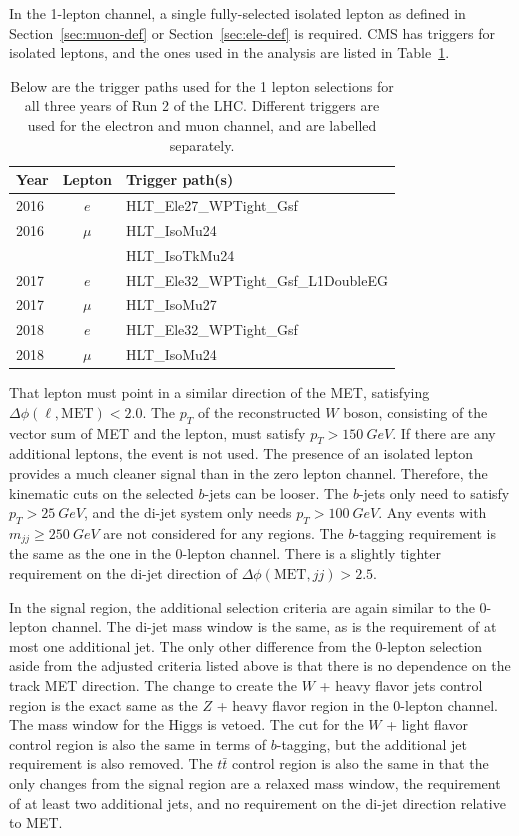 In the 1-lepton channel, a single fully-selected isolated lepton as defined in
Section~\ref{sec:muon-def} or Section~\ref{sec:ele-def} is required.
CMS has triggers for isolated leptons,
and the ones used in the analysis are listed in Table~\ref{tab:1-triggers}.
\begin{table}
  \centering
  \caption[Triggers for the 1 lepton selections]{
    Below are the trigger paths used for the 1 lepton selections
    for all three years of Run 2 of the LHC.
    Different triggers are used for the electron and muon channel,
    and are labelled separately.
  }
  \begin{tabular}{|l|c|l|}
    \hline
    Year & Lepton & Trigger path(s) \\
    \hline
    2016 & $e$ & HLT\_Ele27\_WPTight\_Gsf \\
    \hline
    2016 & $\mu$ & HLT\_IsoMu24 \\
    & & HLT\_IsoTkMu24 \\
    \hline
    2017 & $e$ & HLT\_Ele32\_WPTight\_Gsf\_L1DoubleEG \\
    \hline
    2017 & $\mu$ & HLT\_IsoMu27 \\
    \hline
    2018 & $e$ & HLT\_Ele32\_WPTight\_Gsf \\
    \hline
    2018 & $\mu$ & HLT\_IsoMu24 \\
    \hline
  \end{tabular}
  \label{tab:1-triggers}
\end{table}
That lepton must point in a similar direction of the MET,
satisfying $\Delta \phi(\ell, \mathrm{MET}) < 2.0$.
The $p_T$ of the reconstructed $W$ boson, consisting of the vector sum of MET and the lepton,
must satisfy $p_T > \SI{150}{GeV}$.
If there are any additional leptons, the event is not used.
The presence of an isolated lepton provides
a much cleaner signal than in the zero lepton channel.
Therefore, the kinematic cuts on the selected $b$-jets can be looser.
The $b$-jets only need to satisfy $p_T > \SI{25}{GeV}$,
and the di-jet system only needs $p_T > \SI{100}{GeV}$.
Any events with $m_{jj} \ge \SI{250}{GeV}$ are not considered for any regions.
The $b$-tagging requirement is the same as the one in the 0-lepton channel.
There is a slightly tighter requirement on the di-jet direction of
$\Delta\phi(\mathrm{MET}, jj) > 2.5$.

In the signal region, the additional selection criteria are again similar to the 0-lepton channel.
The di-jet mass window is the same, as is the requirement of at most one additional jet.
The only other difference from the 0-lepton selection
aside from the adjusted criteria listed above
is that there is no dependence on the track MET direction.
The change to create the $W$ + heavy flavor jets control region is the exact same as the
$Z$ + heavy flavor region in the 0-lepton channel.
The mass window for the Higgs is vetoed.
The cut for the $W$ + light flavor control region is also the same in terms of $b$-tagging,
but the additional jet requirement is also removed.
The $t\bar{t}$ control region is also the same in that
the only changes from the signal region
are a relaxed mass window, the requirement of at least two additional jets,
and no requirement on the di-jet direction relative to MET.

